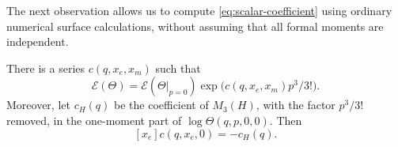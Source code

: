The next observation allows us to compute \eqref{eq:scalar-coefficient}
using ordinary numerical surface calculations, without assuming that
all formal moments are independent.

\begin{lemma}\label{lem:moment-additivity}
There is a series \(c(q,x_e,x_m)\) such that
\begin{equation}\label{eq:theta-exponential}
 \mathcal E(\Theta)
 =
 \mathcal E(\Theta|_{p=0})
 \exp\bigl(c(q,x_e,x_m)p^3/3!\bigr).
\end{equation}
Moreover, let \(c_H(q)\) be the coefficient of \(M_3(H)\), with the
factor \(p^3/3!\) removed, in the one-moment part of
\(\log\Theta(q,p,0,0)\). Then
\begin{equation}\label{eq:shift-derivative}
 [x_e]c(q,x_e,0)=-c_H(q).
\end{equation}
\end{lemma}

